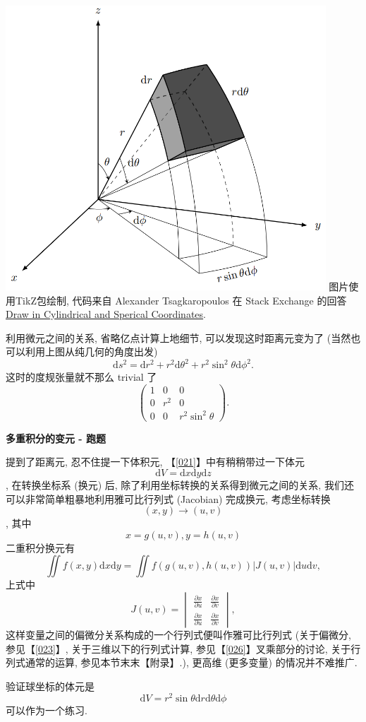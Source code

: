 \begin{newquote}
\begin{tcolorbox}[size=fbox, breakable, enhanced jigsaw]
  \includegraphics[width=0.9\textwidth]{img/image-20240117100344273.png}
图片使用TikZ包绘制, 代码来自 Alexander Tsagkaropoulos 在 Stack Exchange
的回答
\href{https://tex.stackexchange.com/questions/159445/draw-in-cylindrical-and-\%20spherical-coordinates/159452}{Draw
in Cylindrical and Sperical Coordinates}.
\end{tcolorbox}


利用微元之间的关系, 省略亿点计算上地细节, 可以发现这时距离元变为了
(当然也可以利用上图从纯几何的角度出发) \[
\mathrm{d}s^2=\mathrm{d}r^2+r^2\mathrm{d}\theta^2+r^2\sin^2\theta\mathrm{d}\phi^2.
\] 这时的度规张量就不那么 trivial 了 \[
\begin{pmatrix}1&0&0\\0&r^2&0\\0&0&r^2\sin^2\theta\end{pmatrix}.
\]


\textbf{多重积分的变元 - 跑题}

提到了距离元, 忍不住提一下体积元, 【\ref{021}】中有稍稍带过一下体元
\[\mathrm{d}V=\mathrm{d}x\mathrm{d}y\mathrm{d}z\], 在转换坐标系 (换元)
后, 除了利用坐标转换的关系得到微元之间的关系,
我们还可以非常简单粗暴地利用雅可比行列式 (Jacobian) 完成换元,
考虑坐标转换 \[(x,y)\rightarrow(u,v)\], 其中 \[x=g(u,v), y=h(u,v)\]
二重积分换元有 \[
\iint f(x,y)\mathrm{d}x\mathrm{d}y=\iint f(g(u,v),h(u,v))|J(u,v)|\mathrm{d}u\mathrm{d}v,
\] 上式中 \[
J(u,v)=\begin{vmatrix}\frac{\partial x}{\partial u}&\frac{\partial x}{\partial v}\\\frac{\partial x}{\partial u}&\frac{\partial x}{\partial v}\end{vmatrix},
\] 这样变量之间的偏微分关系构成的一个行列式便叫作雅可比行列式
(关于偏微分, 参见【\ref{023}】, 关于三维以下的行列式计算,
参见【\ref{026}】叉乘部分的讨论, 关于行列式通常的运算, 参见本节末末【附录】.),
更高维 (更多变量) 的情况并不难推广.

验证球坐标的体元是
\[\mathrm{d}V=r^2\sin\theta\mathrm{d}r\mathrm{d}\theta\mathrm{d}\phi\]
可以作为一个练习.

\end{newquote}

